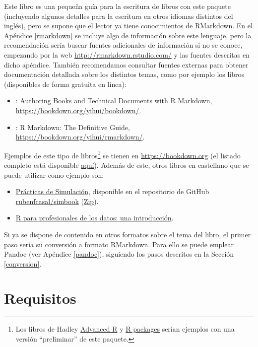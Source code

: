 \documentclass[
]{book}
\theoremstyle{definition}
\theoremstyle{definition}
\theoremstyle{definition}
\theoremstyle{definition}
\theoremstyle{remark}
\begin{document}
Este libro es una pequeña guía para la escritura de libros con este paquete
(incluyendo algunos detalles para la escritura en otros idiomas distintos del inglés),
pero se supone que el lector ya tiene conocimientos de RMarkdown.
En el Apéndice \ref{rmarkdown} se incluye algo de información sobre este lenguaje,
pero la recomendación sería buscar fuentes adicionales de información si no se conoce,
empezando por la web \url{http://rmarkdown.rstudio.com/} y las fuentes descritas en dicho apéndice.
También recomendamos consultar fuentes externas para obtener documentación detallada sobre los distintos temas, como por ejemplo los libros (disponibles de forma gratuita en línea):

\begin{itemize}
\item
  \citet{R-bookdown} : Authoring Books and Technical Documents with R Markdown,
  \url{https://bookdown.org/yihui/bookdown/}.
\item
  \citet{xie2018r} : R Markdown: The Definitive Guide,
  \url{https://bookdown.org/yihui/rmarkdown/}.
\end{itemize}

Ejemplos de este tipo de libros\footnote{Los libros de Hadley \href{http://adv-r.had.co.nz}{Advanced R} y \href{http://r-pkgs.had.co.nz}{R packages}
  serían ejemplos con una versión ``preliminar'' de este paquete.}
se tienen en \url{https://bookdown.org} (el listado completo está disponible \href{https://bookdown.org/home/archive/}{aquí}).
Además de este, otros libros en castellano que se puede utilizar como ejemplo son:

\begin{itemize}
\item
  \href{https://rubenfcasal.github.io/simbook}{Prácticas de Simulación},
  disponible en el repositorio de GitHub
  \href{https://github.com/rubenfcasal/simbook}{rubenfcasal/simbook}
  (\href{https://github.com/rubenfcasal/simbook/archive/master.zip}{Zip}).
\item
  \href{https://www.datanalytics.com/libro_r/index.html}{R para profesionales de los datos: una introducción}.
\end{itemize}

Si ya se dispone de contenido en otros formatos sobre el tema del libro,
el primer paso sería su conversión a formato RMarkdown. Para ello se puede emplear Pandoc (ver Apéndice \ref{pandoc}),
siguiendo los pasos descritos en la Sección \ref{conversion}.

\hypertarget{requisitos}{%
\section{Requisitos}\label{requisitos}}
\end{document}
